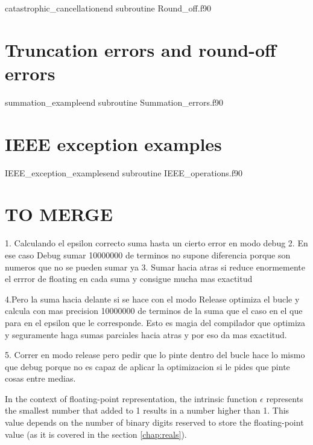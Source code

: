     
{catastrophic_cancellation}{end subroutine}
{Round_off.f90} 





\newpage    
\section{Truncation errors and round-off errors}
    
     
{summation_example}{end subroutine}
{Summation_errors.f90} 



\newpage    
\section{IEEE exception examples}
    
    
{IEEE_exception_examples}{end subroutine}
{IEEE_operations.f90} 






\section{TO MERGE}


1. Calculando el epsilon correcto suma hasta un cierto error en modo debug
2. En ese caso Debug sumar 10000000 de terminos no supone diferencia porque son numeros que no se pueden sumar ya
3. Sumar hacia atras si reduce enormemente el errror de floating en cada suma y consigue mucha mas exactitud

4.Pero la suma hacia delante si se hace con el modo Release optimiza el bucle y calcula con  mas precision 10000000 de terminos de la suma que el caso en el que para en el epsilon que le corresponde. Esto es magia del compilador que optimiza y seguramente haga sumas parciales hacia atras y por eso da mas exactitud. 

5. Correr en modo release pero pedir que lo pinte dentro del bucle hace lo mismo que debug porque no es capaz de aplicar la optimizacion si le pides que pinte cosas entre medias. 

In the context of floating-point representation, the intrinsic function $\epsilon$ represents the smallest 
number that added to 1 results in a number higher than 1.
This value depends on the number of binary digits reserved to store the floating-point
value (as it is covered in the section \ref{chap:reals}). 

